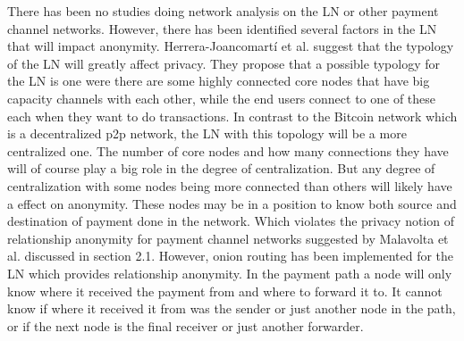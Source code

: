 There has been no studies doing network analysis on the LN or other payment channel networks.
However, there has been identified several factors in the LN that will impact anonymity.
Herrera-Joancomartí et al. \cite{herrera2016privacy} suggest that the typology of the LN will greatly affect privacy. 
They propose that a possible typology for the LN is one were there are some highly connected core nodes that have big capacity channels with each other, while the end users connect to one of these each when they want to do transactions. In contrast to the Bitcoin network which is a decentralized p2p network, the LN with this topology will be a more centralized one. The number of core nodes and how many connections they have will of course play a big role in the degree of centralization. But any degree of centralization with some nodes being more connected than others will likely have a effect on anonymity. These nodes may be in a position to know both source and destination of payment done in the network. Which violates the privacy notion of relationship anonymity for payment channel networks suggested by Malavolta et al. \cite{malavolta2017concurrency} discussed in section 2.1.
However, onion routing \cite{LN_onion_implementation} has been implemented for the LN which provides relationship anonymity.
In the payment path a node will only know where it received the payment from and where to forward it to. It cannot know if where it received it from was the sender or just another node in the path, or if the next node is the final receiver or just another forwarder. 

